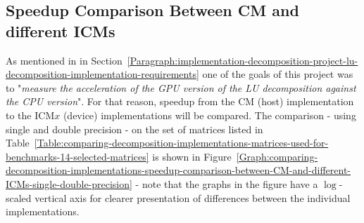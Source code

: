 \subsection{Speedup Comparison Between CM and different ICMs \TO}\label{Subsection:comparing-decomposition-implementations-speedup-comparison-between-CM-and-different-ICMs}
As mentioned in \textit{} in Section~\ref{Paragraph:implementation-decomposition-project-lu-decomposition-implementation-requirements} one of the goals of this project was to "\textit{measure the acceleration of the GPU version of the LU decomposition against the CPU version}". For that reason, speedup from the CM (host) implementation to the ICM$ x $ (device) implementations will be compared. The comparison - using single and double precision - on the set of matrices listed in Table~\ref{Table:comparing-decomposition-implementations-matrices-used-for-benchmarks-14-selected-matrices} is shown in Figure~\ref{Graph:comparing-decomposition-implementations-speedup-comparison-between-CM-and-different-ICMs-single-double-precision} - note that the graphs in the figure have a $ \log $-scaled vertical axis for clearer presentation of differences between the individual implementations.

